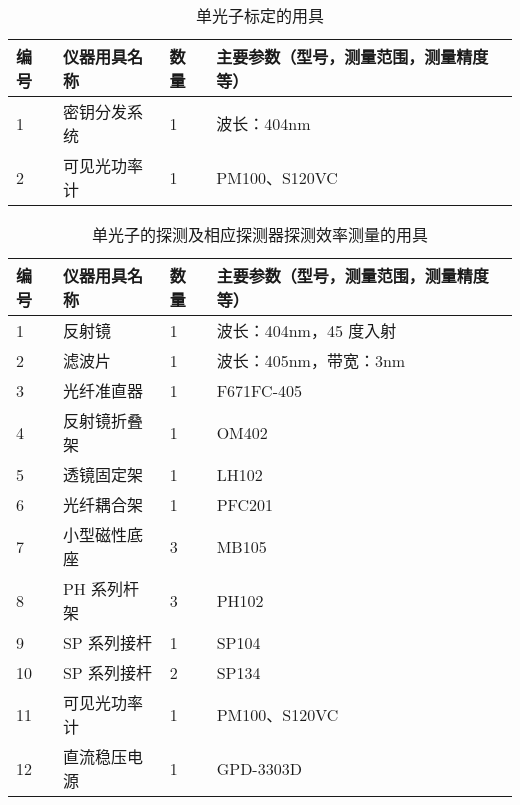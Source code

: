 \documentclass[dvipsnames, svgnames,a4paper,11pt]{article}
\begin{document}
\begin{table}[htbp]
	\centering
	\renewcommand\arraystretch{1.6}
	\caption{单光子标定的用具}
	\begin{tabular}{p{}|p{}|p{}|p{}}
		\hline
		编号& 仪器用具名称 & 数量 &  主要参数（型号，测量范围，测量精度等） \\
		\hline
		1	&	密钥分发系统 	& 1 & 波长：404nm	\\

		2	&	可见光功率计 	& 1 & PM100、S120VC	 \\
		\hline
	\end{tabular}
	\label{tbl:单光子标定的用具}

\end{table}

\begin{table}[htbp]
	\centering
	\renewcommand\arraystretch{1.6}
	\caption{单光子的探测及相应探测器探测效率测量的用具}
	\begin{tabular}{p{}|p{}|p{}|p{}}
		\hline
		编号& 仪器用具名称 & 数量 &  主要参数（型号，测量范围，测量精度等） \\
		\hline
		1	&	反射镜 	& 1 & 波长：404nm，45 度入射	\\

		2	&	滤波片 	& 1 & 波长：405nm，带宽：3nm	 \\
		
		3	&	光纤准直器 & 1 &	F671FC-405 	\\
		
		4	&	反射镜折叠架	& 1 & OM402	\\
		
		5	&	透镜固定架	& 1 & LH102	\\

		6	&	光纤耦合架	& 1 & PFC201 \\

		7	&	小型磁性底座	& 3 & MB105	\\

		8	&	PH 系列杆架	& 3 & PH102	\\

		9	&	SP 系列接杆	& 1 & SP104	\\

		10	&	SP 系列接杆	& 2	& SP134	\\

		11	&	可见光功率计	& 1 & PM100、S120VC	\\

		12	&	直流稳压电源& 1 & GPD-3303D	\\
		\hline
	\end{tabular}
	\label{tbl:单光子的探测及相应探测器探测效率测量的用具}

\end{table}
\end{document}
